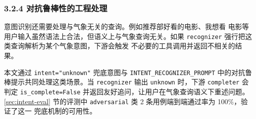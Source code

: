 \subsubsection*{3.2.4 \quad 对抗鲁棒性的工程处理}

意图识别还需要处理与气象无关的查询。例如推荐部好看的电影、我想看
电影等用户输入虽然语法上合法，但语义上与气象查询无关。如果
\texttt{recognizer} 强行把这类查询解析为某个气象意图，下游会触发
不必要的工具调用并返回不相关的结果。

本文通过 \texttt{intent=\bk{}"unknown"} 兜底意图与 \texttt{INTENT\_\bk{}RECOGNIZER\_\bk{}PROMPT}
中的对抗鲁棒提示共同处理这类场景。当 \texttt{recognizer} 输出
\texttt{unknown} 时，下游 \texttt{completer} 会判定 \texttt{is\_\bk{}complete=\bk{}False}
并返回友好追问，让用户在气象查询语义下重述问题。
\ref{sec:intent-eval} 节的评测中
\texttt{adversarial} 类 2 条用例端到端通过率为 100\%，验证了这一
兜底机制的可用性。

